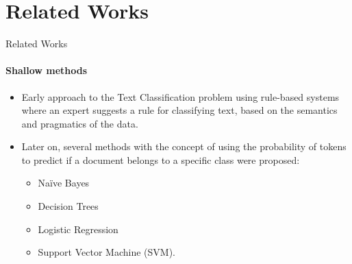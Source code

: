 \section{Related Works}
\begin{frame}{Related Works}
\framesubtitle{Shallow methods}
\begin{itemize}
\item Early approach to the Text Classification problem using rule-based systems where an expert suggests a rule for classifying text, based on the semantics and pragmatics of the data. 

\item Later on, several methods with the concept of using the probability of tokens to predict if a document belongs
to a specific class were proposed:
\begin{itemize}
\item Na\"ive Bayes\cite{Xu2017}
\item Decision Trees\cite{Safavian1991}
\item Logistic Regression\cite{Genkin2007}
\item Support Vector Machine (SVM)\cite{boser1992, cortesvapnik1995}.
\end{itemize}
\end{itemize}
\end{frame}

